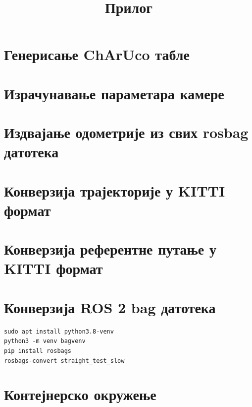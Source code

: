 \documentclass[12pt]{article}
\title{Прилог}
\author{}
\date{}
\begin{document}
\maketitle
\thispagestyle{empty}

\section*{Генерисање ChArUco табле}

\begingroup
\fontsize{8}{9}\selectfont

\endgroup

\section*{Израчунавање параметара камере}

\begingroup
\fontsize{8}{9}\selectfont

\endgroup

\section*{Издвајање одометрије из свих rosbag датотека}

\begingroup
\fontsize{8}{9}\selectfont

\endgroup

\section*{Конверзија трајекторије у KITTI формат}

\begingroup
\fontsize{8}{9}\selectfont

\endgroup

\section*{Конверзија референтне путање у KITTI формат}

\begingroup
\fontsize{8}{9}\selectfont

\endgroup

\section*{Конверзија ROS 2 bag датотека}

\begingroup
\fontsize{8}{9}\selectfont
\begin{verbatim}
sudo apt install python3.8-venv
python3 -m venv bagvenv
pip install rosbags
rosbags-convert straight_test_slow
\end{verbatim}
\endgroup

\section*{Контејнерско окружење}

\begingroup
\fontsize{8}{9}\selectfont

\endgroup
\end{document}
